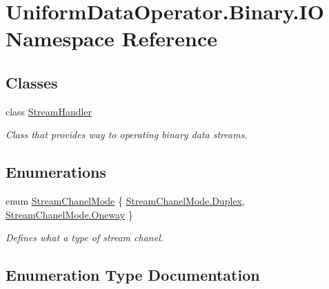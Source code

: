 \hypertarget{namespace_uniform_data_operator_1_1_binary_1_1_i_o}{}\section{Uniform\+Data\+Operator.\+Binary.\+IO Namespace Reference}
\label{namespace_uniform_data_operator_1_1_binary_1_1_i_o}
\subsection*{Classes}
\begin{DoxyCompactItemize}
\item 
class \mbox{\hyperlink{class_uniform_data_operator_1_1_binary_1_1_i_o_1_1_stream_handler}{Stream\+Handler}}
\begin{DoxyCompactList}\small\item\em Class that provides way to operating binary data streams. \end{DoxyCompactList}\end{DoxyCompactItemize}
\subsection*{Enumerations}
\begin{DoxyCompactItemize}
\item 
enum \mbox{\hyperlink{namespace_uniform_data_operator_1_1_binary_1_1_i_o_a3fee9a9bcba25974554ed63395942161}{Stream\+Chanel\+Mode}} \{ \mbox{\hyperlink{namespace_uniform_data_operator_1_1_binary_1_1_i_o_a3fee9a9bcba25974554ed63395942161acfefe70df0902a80bb48b04ff12a7436}{Stream\+Chanel\+Mode.\+Duplex}}, 
\mbox{\hyperlink{namespace_uniform_data_operator_1_1_binary_1_1_i_o_a3fee9a9bcba25974554ed63395942161ab6f2b2a3b9675cbd2f00f92c5bd93dd4}{Stream\+Chanel\+Mode.\+Oneway}}
 \}
\begin{DoxyCompactList}\small\item\em Defines what a type of stream chanel. \end{DoxyCompactList}\end{DoxyCompactItemize}


\subsection{Enumeration Type Documentation}
\mbox{\label{namespace_uniform_data_operator_1_1_binary_1_1_i_o_a3fee9a9bcba25974554ed63395942161}} 
